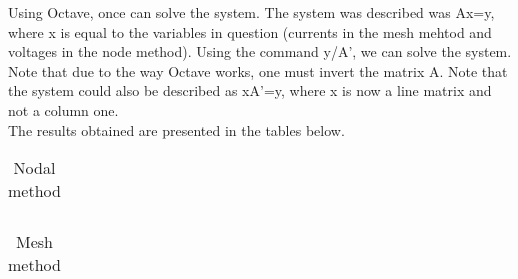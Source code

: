Using Octave, once can solve the system. The system was described was Ax=y, where x is equal to the variables in question (currents in the mesh mehtod and voltages in the node method). Using the command y/A', we can solve the system. Note that due to the way Octave works, one must invert the matrix A. Note that the system could also be described as xA'=y, where x is now a line matrix and not a column one.\\
The results obtained are presented in the tables below.

\FloatBarrier
\begin{table}[h]
  \centering
  \begin{tabular}{|c|c|c|c|c|c|c|}
    \hline    
    
    \hline
  \end{tabular}
  \caption{Nodal method}
  \label{tab:nodal}
\end{table}
\FloatBarrier

\FloatBarrier
\begin{table}[h]
  \centering
  \begin{tabular}{|c|c|c|c|}
    \hline    
    
    \hline
  \end{tabular}
  \caption{Mesh method}
  \label{tab:mesh}
\end{table}
\FloatBarrier
